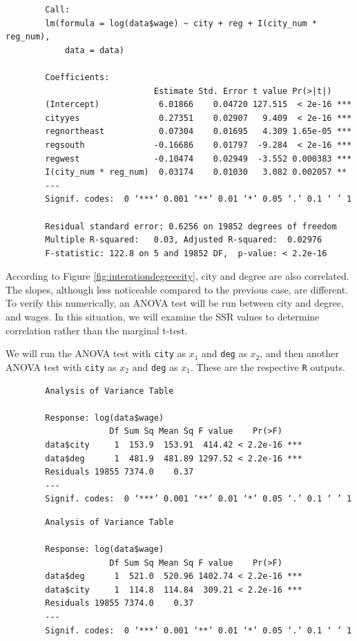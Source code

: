 \documentclass{article}
\begin{document}
      \begin{verbatim}
        Call:
        lm(formula = log(data$wage) ~ city + reg + I(city_num * reg_num),
            data = data)

        Coefficients:
                              Estimate Std. Error t value Pr(>|t|)
        (Intercept)            6.01866    0.04720 127.515  < 2e-16 ***
        cityyes                0.27351    0.02907   9.409  < 2e-16 ***
        regnortheast           0.07304    0.01695   4.309 1.65e-05 ***
        regsouth              -0.16686    0.01797  -9.284  < 2e-16 ***
        regwest               -0.10474    0.02949  -3.552 0.000383 ***
        I(city_num * reg_num)  0.03174    0.01030   3.082 0.002057 **
        ---
        Signif. codes:  0 ‘***’ 0.001 ‘**’ 0.01 ‘*’ 0.05 ‘.’ 0.1 ‘ ’ 1

        Residual standard error: 0.6256 on 19852 degrees of freedom
        Multiple R-squared:   0.03,	Adjusted R-squared:  0.02976
        F-statistic: 122.8 on 5 and 19852 DF,  p-value: < 2.2e-16
      \end{verbatim}

      According to Figure \ref{fig:interationdegreecity}, city and degree
      are also correlated. The slopes, although less noticeable compared
      to the previous case, are different. To verify this numerically, an
      ANOVA test will be run between city and degree, and wages. In this
      situation, we will examine the SSR values to determine correlation
      rather than the marginal t-test.

      We will run the ANOVA test with \texttt{city} as $x_1$ and \texttt{deg} as $x_2$,
      and then another ANOVA test with \texttt{city} as $x_2$ and \texttt{deg} as $x_1$.
      These are the respective \texttt{R} outputs.

      \begin{verbatim}
        Analysis of Variance Table

        Response: log(data$wage)
                     Df Sum Sq Mean Sq F value    Pr(>F)
        data$city     1  153.9  153.91  414.42 < 2.2e-16 ***
        data$deg      1  481.9  481.89 1297.52 < 2.2e-16 ***
        Residuals 19855 7374.0    0.37
        ---
        Signif. codes:  0 ‘***’ 0.001 ‘**’ 0.01 ‘*’ 0.05 ‘.’ 0.1 ‘ ’ 1
      \end{verbatim}

      \begin{verbatim}
        Analysis of Variance Table

        Response: log(data$wage)
                     Df Sum Sq Mean Sq F value    Pr(>F)
        data$deg      1  521.0  520.96 1402.74 < 2.2e-16 ***
        data$city     1  114.8  114.84  309.21 < 2.2e-16 ***
        Residuals 19855 7374.0    0.37
        ---
        Signif. codes:  0 ‘***’ 0.001 ‘**’ 0.01 ‘*’ 0.05 ‘.’ 0.1 ‘ ’ 1
      \end{verbatim}
\end{document}

